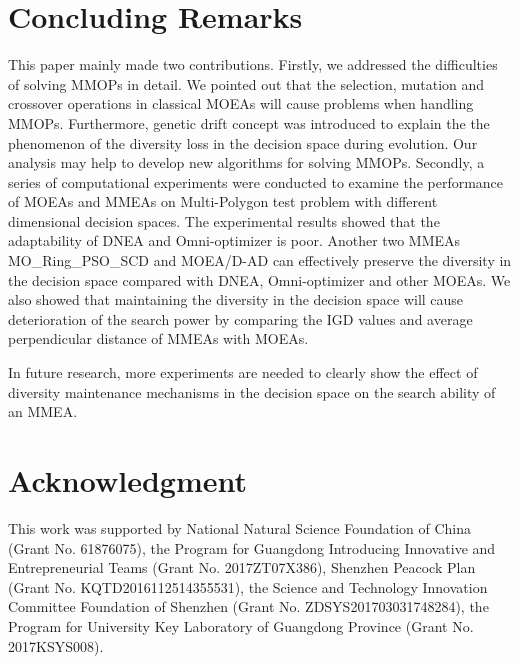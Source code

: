 \documentclass[conference]{IEEEtran}
\begin{document}
\section{Concluding Remarks}
\label{Conclusion}
This paper mainly made two contributions. Firstly, we addressed the difficulties of solving MMOPs in detail. We pointed out that the selection, mutation and crossover operations in classical MOEAs will cause problems when handling MMOPs. Furthermore, genetic drift concept was introduced to explain the the phenomenon of the diversity loss in the decision space during evolution. Our analysis may help to develop new algorithms for solving MMOPs. Secondly, a series of computational experiments were conducted to examine the performance of MOEAs and MMEAs on Multi-Polygon test problem with different dimensional decision spaces. The experimental results showed that the adaptability of DNEA and Omni-optimizer is poor. Another two MMEAs MO\_Ring\_PSO\_SCD and MOEA/D-AD can effectively preserve the diversity in the decision space compared with DNEA, Omni-optimizer and other MOEAs. We also showed that maintaining the diversity in the decision space will cause deterioration of the search power by comparing the IGD values and average perpendicular distance of MMEAs with MOEAs. 

In future research, more experiments are needed to clearly show the effect of diversity maintenance mechanisms in the decision space on the search ability of an MMEA.

\section*{Acknowledgment}
This work was supported by National Natural Science Foundation of China (Grant No. 61876075), the Program for Guangdong Introducing Innovative and Entrepreneurial Teams (Grant No. 2017ZT07X386), Shenzhen Peacock Plan (Grant No. KQTD2016112514355531), the Science and Technology Innovation Committee Foundation of Shenzhen (Grant No. ZDSYS201703031748284), the Program for University Key Laboratory of Guangdong Province (Grant No. 2017KSYS008).


\end{document}
